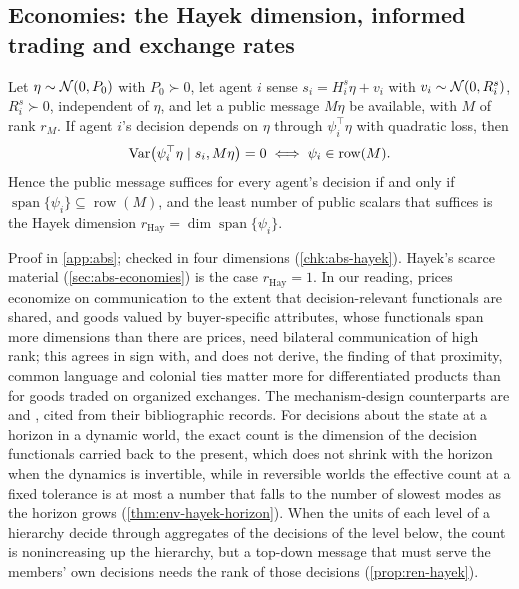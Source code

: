 \subsection{Economies: the Hayek dimension, informed trading and exchange rates}\label{sup:abs-economies-the-hayek-dimension-informed-t}

\begin{proposition}\label{prop:abs-hayek}
Let $\eta\sim\mathcal{N}(0,P_0)$ with $P_0\succ0$, let agent $i$ sense $s_i=H^s_i\eta+v_i$ with $v_i\sim\mathcal{N}(0,R^s_i)$, $R^s_i\succ0$, independent of $\eta$, and let a public message $M\eta$ be available, with $M$ of rank $r_M$. If agent $i$'s decision depends on $\eta$ through $\psi_i^\top\eta$ with quadratic loss, then
\[
\operatorname{Var}\bigl(\psi_i^\top\eta\mid s_i,M\eta\bigr)=0\iff\psi_i\in\operatorname{row}(M).
\]
Hence the public message suffices for every agent's decision if and only if $\operatorname{span}\{\psi_i\}\subseteq\operatorname{row}(M)$, and the least number of public scalars that suffices is the Hayek dimension $r_{\mathrm{Hay}}=\dim\operatorname{span}\{\psi_i\}$.
\end{proposition}

Proof in \cref{app:abs}; checked in four dimensions (\cref{chk:abs-hayek}). Hayek's scarce material (\cref{sec:abs-economies}) is the case $r_{\mathrm{Hay}}=1$. In our reading, prices economize on communication to the extent that decision-relevant functionals are shared, and goods valued by buyer-specific attributes, whose functionals span more dimensions than there are prices, need bilateral communication of high rank; this agrees in sign with, and does not derive, the finding of \citet{rauch1999networks} that proximity, common language and colonial ties matter more for differentiated products than for goods traded on organized exchanges. The mechanism-design counterparts are \citet{jordan1982competitive} and \citet{mount1974informational}, cited from their bibliographic records. For decisions about the state at a horizon in a dynamic world, the exact count is the dimension of the decision functionals carried back to the present, which does not shrink with the horizon when the dynamics is invertible, while in reversible worlds the effective count at a fixed tolerance is at most a number that falls to the number of slowest modes as the horizon grows (\cref{thm:env-hayek-horizon}). When the units of each level of a hierarchy decide through aggregates of the decisions of the level below, the count is nonincreasing up the hierarchy, but a top-down message that must serve the members' own decisions needs the rank of those decisions (\cref{prop:ren-hayek}).

